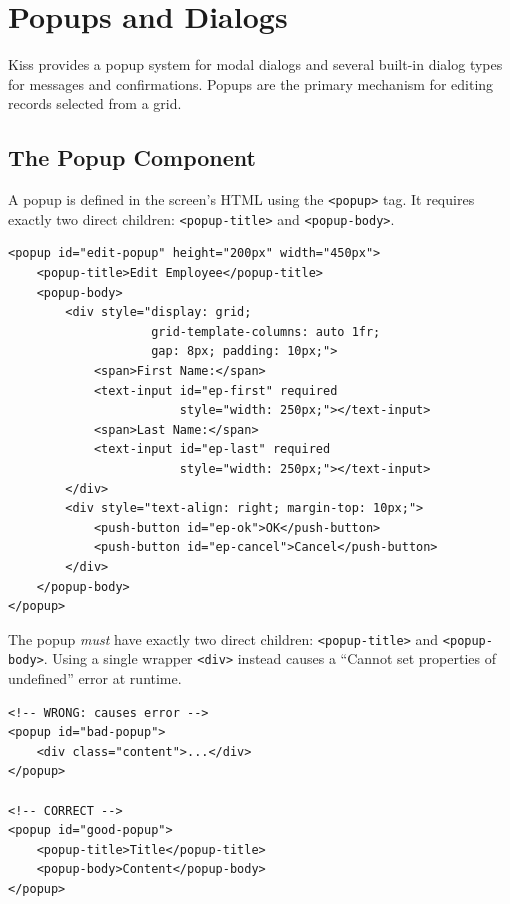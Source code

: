 \chapter{Popups and Dialogs}
\label{ch:popups}

Kiss provides a popup system for modal dialogs and several built-in dialog types for messages and confirmations.  Popups are the primary mechanism for editing records selected from a grid.

\section{The Popup Component}
\label{sec:popup-component}

A popup is defined in the screen's HTML using the \texttt{<popup>} tag.  It requires exactly two direct children: \texttt{<popup-title>} and \texttt{<popup-body>}.

\begin{lstlisting}[style=html]
<popup id="edit-popup" height="200px" width="450px">
    <popup-title>Edit Employee</popup-title>
    <popup-body>
        <div style="display: grid;
                    grid-template-columns: auto 1fr;
                    gap: 8px; padding: 10px;">
            <span>First Name:</span>
            <text-input id="ep-first" required
                        style="width: 250px;"></text-input>
            <span>Last Name:</span>
            <text-input id="ep-last" required
                        style="width: 250px;"></text-input>
        </div>
        <div style="text-align: right; margin-top: 10px;">
            <push-button id="ep-ok">OK</push-button>
            <push-button id="ep-cancel">Cancel</push-button>
        </div>
    </popup-body>
</popup>
\end{lstlisting}

\begin{warnbox}
The popup \emph{must} have exactly two direct children: \texttt{<popup-title>} and \texttt{<popup-body>}.  Using a single wrapper \texttt{<div>} instead causes a ``Cannot set properties of undefined'' error at runtime.

\begin{lstlisting}[style=html]
<!-- WRONG: causes error -->
<popup id="bad-popup">
    <div class="content">...</div>
</popup>

<!-- CORRECT -->
<popup id="good-popup">
    <popup-title>Title</popup-title>
    <popup-body>Content</popup-body>
</popup>
\end{lstlisting}
\end{warnbox}

